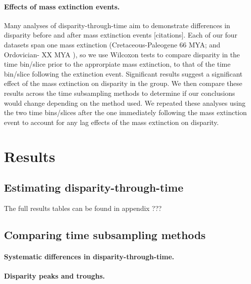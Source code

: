 \documentclass[12pt,a4paper]{article}
\begin{document}
\paragraph{Effects of mass extinction events.}
Many analyses of disparity-through-time aim to demonstrate differences in disparity before and after mass extinction events [citations]. 
Each of our four datasets span one mass extinction (Cretaceous-Paleogene 66 MYA; \cite{brusatte2014gradual,bapst2016topology,beckancient2014} and Ordovician- XX MYA \cite{wright2017bayesian}), so we use Wilcoxon tests to compare disparity in the time bin/slice prior to the approrpiate mass extinction, to that of the time bin/slice following the extinction event. 
Significant results suggest a significant effect of the mass extinction on disparity in the group.
We then compare these results across the time subsampling methods to determine if our conclusions would change depending on the method used.
We repeated these analyses using the two time bins/slices after the one immediately following the mass extinction event to account for any lag effects of the mass extinction on disparity.

\section{Results} 

\subsection{Estimating disparity-through-time}

The full results tables can be found in appendix ??? %


\subsection{Comparing time subsampling methods}

\paragraph{Systematic differences in disparity-through-time.} 

\paragraph{Disparity peaks and troughs.}
\end{document}
